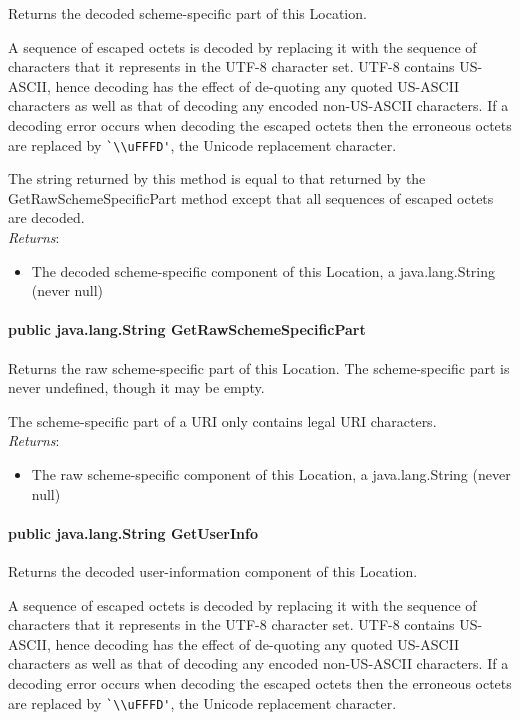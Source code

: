 \documentclass[$Date: 2003/06/26 19:29:31 $]{glabarticle}
\begin{document}
 Returns the decoded scheme-specific part of this Location.
 
 A sequence of escaped octets is decoded by replacing it with the
 sequence of characters that it represents in the UTF-8 character set.
 UTF-8 contains US-ASCII, hence decoding has the effect of de-quoting
 any quoted US-ASCII characters as well as that of decoding any
 encoded non-US-ASCII characters.  If a decoding error occurs when
 decoding the escaped octets then the erroneous octets are replaced by
 \verb"`\\uFFFD'", the Unicode replacement character. 

 The string returned by this method is equal to that returned by the
 GetRawSchemeSpecificPart method except that all sequences of escaped
 octets are decoded.\\
 
 \textit{Returns}:
 \begin{itemize}
 \item[] The decoded scheme-specific component of this Location, a java.lang.String (never null)
 \end{itemize} 
  
\paragraph{public java.lang.String GetRawSchemeSpecificPart}

 Returns the raw scheme-specific part of this Location. The
 scheme-specific part is never undefined, though it may be empty.

 The scheme-specific part of a URI only contains legal URI  characters.\\
 
 \textit{Returns}:
 \begin{itemize}
 \item[] The raw scheme-specific component of this Location, a java.lang.String (never null)
 \end{itemize} 
  
\paragraph{public java.lang.String GetUserInfo}

 Returns the decoded user-information component of this Location.
 
 A sequence of escaped octets is decoded by replacing it with the
 sequence of characters that it represents in the UTF-8 character set.
 UTF-8 contains US-ASCII, hence decoding has the effect of de-quoting
 any quoted US-ASCII characters as well as that of decoding any
 encoded non-US-ASCII characters.  If a decoding error occurs when
 decoding the escaped octets then the erroneous octets are replaced by
 \verb"`\\uFFFD'", the Unicode replacement character.
 
\end{document}
